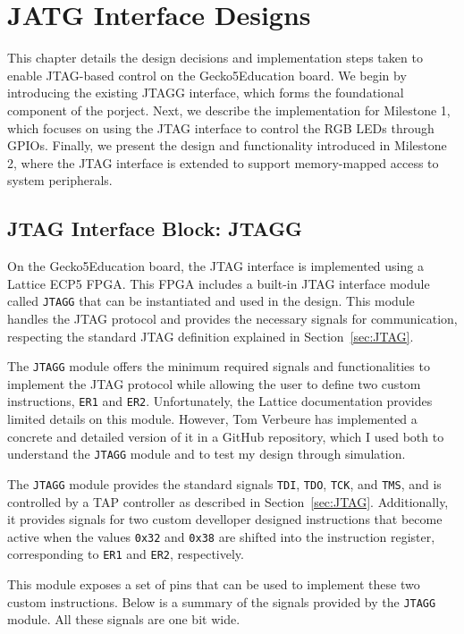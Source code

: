 \documentclass[a4paper,11pt,oneside]{report}
\newcommand{\boardName}{Gecko5Education \xspace}
\begin{document}
\chapter{JATG Interface Designs}

This chapter details the design decisions and implementation steps taken to enable JTAG-based control on the \boardName board.
We begin by introducing the existing JTAGG interface, which forms the foundational component of the porject.
Next, we describe the implementation for Milestone 1, which focuses on using the JTAG interface to control the RGB LEDs through GPIOs.
Finally, we present the design and functionality introduced in Milestone 2, where the JTAG interface is extended to support memory-mapped access to system peripherals.

\section{JTAG Interface Block: JTAGG}

On the \boardName board, the JTAG interface is implemented using a Lattice ECP5 FPGA.
This FPGA includes a built-in JTAG interface module called \texttt{JTAGG} that can be instantiated and used in the design.
This module handles the JTAG protocol and provides the necessary signals for communication,
respecting the standard JTAG definition explained in Section~\ref{sec:JTAG}.

The \texttt{JTAGG} module offers the minimum required signals and functionalities to implement
the JTAG protocol while allowing the user to define two custom instructions, \texttt{ER1} and \texttt{ER2}.
Unfortunately, the Lattice documentation provides limited details on this module.
However, Tom Verbeure has implemented a concrete and detailed version of it in a GitHub repository,
which I used both to understand the \texttt{JTAGG} module and to test my design through simulation.

The \texttt{JTAGG} module provides the standard signals \texttt{TDI}, \texttt{TDO}, \texttt{TCK}, and \texttt{TMS},
and is controlled by a TAP controller as described in Section~\ref{sec:JTAG}.
Additionally, it provides signals for two custom develloper designed instructions that become active when the values
\texttt{0x32} and \texttt{0x38} are shifted into the instruction register,
corresponding to \texttt{ER1} and \texttt{ER2}, respectively.

This module exposes a set of pins that can be used to implement these two custom instructions.
Below is a summary of the signals provided by the \texttt{JTAGG} module.
All these signals are one bit wide.
\end{document}
